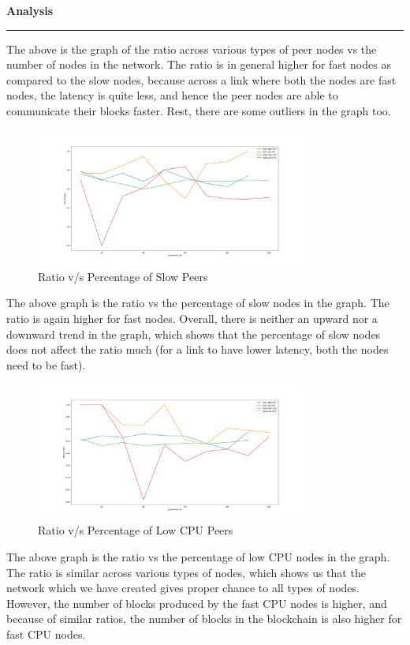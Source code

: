 \documentclass[a4paper,12pt]{article}
\newenvironment{solution}[2][]{%
\begin{mdframed}[linecolor=blue!70!black, linewidth=2pt, roundcorner=10pt, backgroundcolor=yellow!10!white, skipabove=12pt, skipbelow=12pt]%
	\textbf{\large #2}
	\par\noindent\rule{\textwidth}{0.4pt}
}{
\end{mdframed}
}
\begin{document}
\begin{solution}{Analysis}
	The above is the graph of the ratio across various types of peer nodes vs the number of nodes in the network. The ratio is in general higher for fast nodes as compared to the slow nodes, because across a link where both the nodes are fast nodes, the latency is quite less, and hence the peer nodes are able to communicate their blocks faster. Rest, there are some outliers in the graph too.

	\begin{figure}[H]
		\centering
		\includegraphics[width=0.8\textwidth]{../images/avg_run_3/z0.png}
		\caption{Ratio v/s Percentage of Slow Peers}
		\label{fig:simulation_plot2}
	\end{figure}

	The above graph is the ratio vs the percentage of slow nodes in the graph. The ratio is again higher for fast nodes. Overall, there is neither an upward nor a downward trend in the graph, which shows that the percentage of slow nodes does not affect the ratio much (for a link to have lower latency, both the nodes need to be fast).

	\begin{figure}[H]
		\centering
		\includegraphics[width=0.8\textwidth]{../images/avg_run_3/z1.png}
		\caption{Ratio v/s Percentage of Low CPU Peers}
		\label{fig:simulation_plot3}
	\end{figure}

	The above graph is the ratio vs the percentage of low CPU nodes in the graph. The ratio is similar across various types of nodes, which shows us that the network which we have created gives proper chance to all types of nodes. However, the number of blocks produced by the fast CPU nodes is higher, and because of similar ratios, the number of blocks in the blockchain is also higher for fast CPU nodes.



\end{solution}
\end{document}
